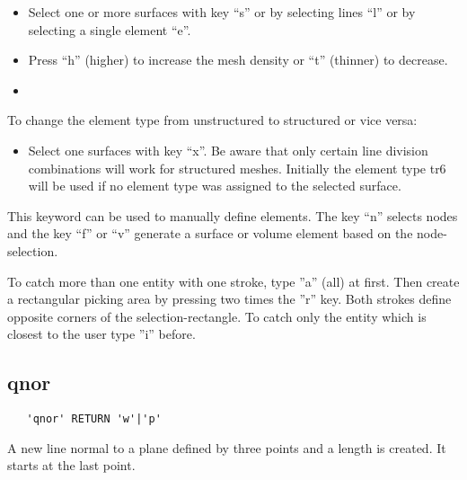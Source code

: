 \documentclass{article}
\begin{document}
\begin{itemize}
\item Select one or more surfaces with key ``s'' or by selecting lines ``l'' or by selecting a single element ``e''.
\item Press ``h'' (higher) to increase the mesh density or ``t'' (thinner) to decrease.  
\item 
\end{itemize}
To change the element type from unstructured to structured or vice versa:
\begin{itemize}
\item Select one surfaces with key ``x''. Be aware that only certain line division combinations will work for structured meshes. Initially the element type tr6 will be used if no element type was assigned to the selected surface.
\end{itemize}

This keyword can be used to manually define elements. The key ``n'' selects nodes and the key ``f'' or ``v'' generate a surface or volume element based on the node-selection.

To catch more than one entity with one stroke, type ''a'' (all) at first. Then create a rectangular picking area by pressing two times the ''r'' key. Both strokes define opposite corners of the selection-rectangle. To catch only the entity which is closest to the user type ''i'' before.

\subsection{\label{qnor}qnor}
\begin{verbatim}
   'qnor' RETURN 'w'|'p'
\end{verbatim}
A new line normal to a plane defined by three points and a length is created. It starts at the last point.
\end{document}
